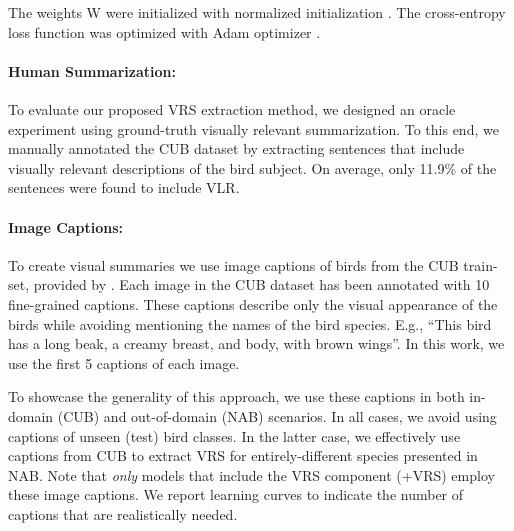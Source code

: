 \documentclass[11pt,a4paper]{article}
\newcommand\gal[1]{\textcolor{bright}{\textbf{GAL:} #1 }}
\newcommand\yuval[1]{\textcolor{darkpink}{\textbf{YUVAL:} #1 }}
\begin{document}


The weights W were initialized with normalized initialization \citep{glorot2010understanding}. The cross-entropy loss function was optimized with Adam optimizer \citep{Adam}.




\paragraph{Human Summarization:} 
To evaluate our proposed VRS extraction method, we designed an oracle experiment using ground-truth visually relevant summarization. To this end, we manually annotated the CUB dataset by extracting sentences that include visually relevant descriptions of the bird subject. On average, only 11.9\% of the sentences were found to include VLR.  

\paragraph{Image Captions:}
To create visual summaries we use image captions of birds from the CUB train-set, provided by \citet{reed2016learning}.  Each image in the CUB dataset has been annotated with 10 fine-grained captions. These captions describe only the visual appearance of the birds while avoiding mentioning the names of the bird species. E.g., \enquote{This bird has a long beak, a creamy breast, and body, with brown wings}. In this work, we use the first 5 captions of each image.


To showcase the generality of this approach, we use these captions in both in-domain (CUB) and out-of-domain (NAB) scenarios. In all cases, we avoid using captions of unseen (test) bird classes.  In the latter case, we effectively use captions from CUB to extract VRS for entirely-different species presented in NAB.  Note that {\em only} models that include the VRS component (+VRS) employ these image captions. We report learning curves to indicate the number of captions that are realistically needed.



\end{document}

